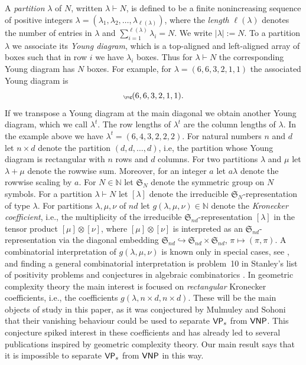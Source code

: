 \documentclass{article}
\numberwithin{equation}{section}
\theoremstyle{definition}
\def\la{\lambda}
\newcommand{\IN}{\mathbb N}
\newcommand{\aS}{\ensuremath{\mathfrak{S}}}
\newcommand{\VPs}{\textup{\textsf{VP$_s$}}}
\newcommand{\VNP}{\textup{\textsf{VNP}}}
\begin{document}
A \emph{partition} $\la$ of $N$, written $\la \vdash N$, is defined to be a finite nonincreasing sequence of positive integers $\la=(\la_1,\la_2,\ldots,\la_{\ell(\la)})$,
where the \emph{length} $\ell(\la)$ denotes the number of entries in $\la$
and $\sum_{i=1}^{\ell(\la)}\la_i=N$. We write $|\la| := N$.
To a partition $\la$ we associate its \emph{Young diagram}, which is a top-aligned and left-aligned array of boxes
such that in row $i$ we have $\la_i$ boxes. Thus for $\la \vdash N$ the corresponding Young diagram has $N$ boxes.
For example, for $\la=(6,6,3,2,1,1)$ the associated Young diagram is
\[
\tiny\yng(6,6,3,2,1,1).
\]
If we transpose a Young diagram at the main diagonal we obtain another Young diagram, which we call $\la^t$.
The row lengths of $\la^t$ are the column lengths of $\la$.
In the example above we have $\la^t=(6,4,3,2,2,2)$.
For natural numbers $n$ and $d$ let $n \times d$ denote the partition $(d,d,\ldots,d)$,
i.e, the partition whose Young diagram is rectangular with $n$ rows and $d$ columns.
For two partitions $\la$ and $\mu$ let $\la+\mu$ denote the rowwise sum.
Moreover, for an integer $a$ let $a\la$ denote the rowwise scaling by $a$.
For $N \in \IN$ let $\aS_N$ denote the symmetric group on $N$ symbols.
For a partition $\la \vdash N$ let $[\la]$ denote the irreducible $\aS_{N}$-representation of type $\la$.
For partitions $\la,\mu,\nu$ of $nd$ let $g(\la,\mu,\nu) \in \IN$ denote the \emph{Kronecker coefficient}, i.e.,
the multiplicity of the irreducible $\aS_{nd}$-representation $[\la]$ in the tensor product $[\mu] \otimes [\nu]$,
where $[\mu] \otimes [\nu]$ is interpreted as an $\aS_{nd}$-representation via the diagonal embedding $\aS_{nd} \hookrightarrow \aS_{nd} \times \aS_{nd}$,
$\pi \mapsto (\pi,\pi)$.
A combinatorial interpretation of $g(\la,\mu,\nu)$ is known only in special cases,
see \cite{lasc:80, remm:89, remm:92, rewe:94, rosa:01, baor:06, bla:12, liu:14, IMW:15, Hay:15},
and finding a general combinatorial interpretation is problem~10 in Stanley's list of
positivity problems and conjectures in algebraic combinatorics \cite{sta:00}.
In geometric complexity theory
the main interest is focused on
\emph{rectangular} Kronecker coefficients,
i.e., the coefficients $g(\la,n \times d,n\times d)$.
These will be the main objects of study in this paper, as it was conjectured by Mulmuley and Sohoni \cite{gct2} that
their vanishing behaviour could be used to separate $\VPs$ from $\VNP$.
This conjecture spiked interest in these coefficients and has already led to several publications
inspired by geometric complexity theory.
Our main result says that it is impossible to separate $\VPs$ from $\VNP$ in this way.
\end{document}
